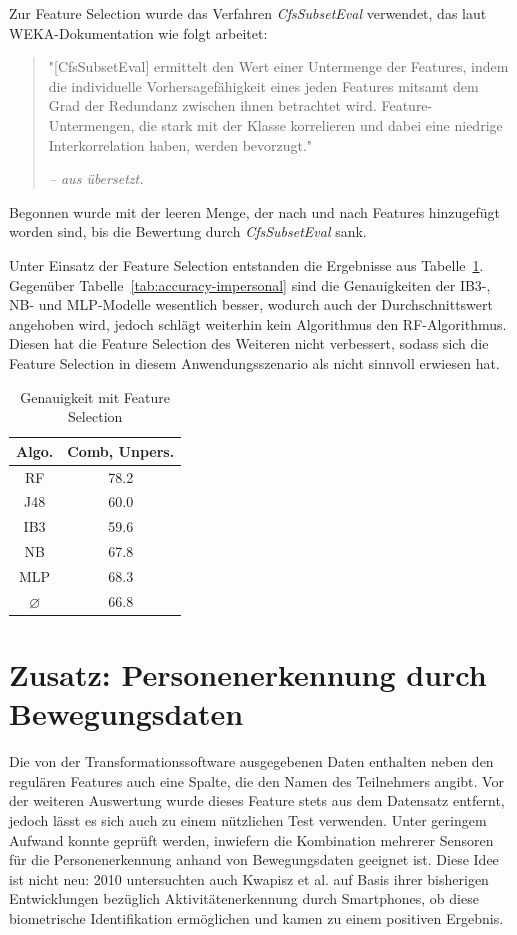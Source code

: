 Zur Feature Selection wurde das Verfahren \textit{CfsSubsetEval} \cite{Hall1998} verwendet, das laut WEKA-Dokumentation wie folgt arbeitet:

\begin{quote}
	"[CfsSubsetEval] ermittelt den Wert einer Untermenge der Features, indem die individuelle Vorhersagefähigkeit eines jeden Features mitsamt dem Grad der Redundanz zwischen ihnen betrachtet wird. Feature-Untermengen, die stark mit der Klasse korrelieren und dabei eine niedrige Interkorrelation haben, werden bevorzugt."
	
	\textit{-- aus \cite{WekaCfsSubsetEval} übersetzt.}
\end{quote}

Begonnen wurde mit der leeren Menge, der nach und nach Features hinzugefügt worden sind, bis die Bewertung durch \textit{CfsSubsetEval} sank.

Unter Einsatz der Feature Selection entstanden die Ergebnisse aus Tabelle~\ref{tab:accuracy-feature-selection}. Gegenüber Tabelle~\ref{tab:accuracy-impersonal} sind die Genauigkeiten der \acs{IB}3-, \acs{NB}- und \acs{MLP}-Modelle wesentlich besser, wodurch auch der Durchschnittswert angehoben wird, jedoch schlägt weiterhin kein Algorithmus den \acs{RF}-Algorithmus. Diesen hat die Feature Selection des Weiteren nicht verbessert, sodass sich die Feature Selection in diesem Anwendungsszenario als nicht sinnvoll erwiesen hat.

\begin{table}
\centering
\begin{tabular}{|c|c|}
	\hline 
	\textbf{Algo.} & \textbf{Comb, Unpers.} \\ 
	\hline 
	\acs{RF} & 78.2 \\ 
	\acs{J48} & 60.0 \\ 
	\acs{IB}3 & 59.6 \\ 
	\acs{NB} & 67.8 \\ 
	\acs{MLP} & 68.3 \\ 
	\hline 
	$\varnothing$ & 66.8 \\ 
	\hline 
\end{tabular}
\caption{Genauigkeit mit Feature Selection}
\label{tab:accuracy-feature-selection}
\end{table}

\section{Zusatz: Personenerkennung durch Bewegungsdaten}
Die von der Transformationssoftware ausgegebenen Daten enthalten neben den regulären Features auch eine Spalte, die den Namen des Teilnehmers angibt. Vor der weiteren Auswertung wurde dieses Feature stets aus dem Datensatz entfernt, jedoch lässt es sich auch zu einem nützlichen Test verwenden. Unter geringem Aufwand konnte geprüft werden, inwiefern die Kombination mehrerer Sensoren für die Personenerkennung anhand von Bewegungsdaten geeignet ist. Diese Idee ist nicht neu: 2010 untersuchten auch Kwapisz et al. auf Basis ihrer bisherigen Entwicklungen bezüglich Aktivitätenerkennung durch Smartphones, ob diese biometrische Identifikation ermöglichen \cite{Kwapisz2010} und kamen zu einem positiven Ergebnis.


